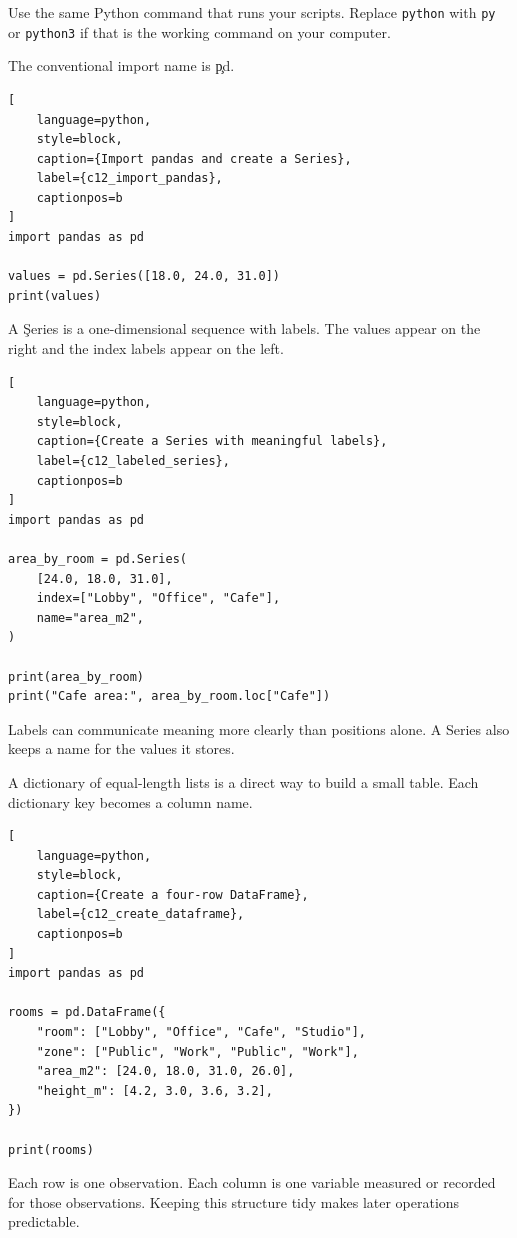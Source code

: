 Use the same Python command that runs your scripts. Replace \texttt{python}
with \texttt{py} or \texttt{python3} if that is the working command on your
computer.

The conventional import name is \c{pd}.

\begin{lstlisting}[
    language=python,
    style=block,
    caption={Import pandas and create a Series},
    label={c12_import_pandas},
    captionpos=b
]
import pandas as pd

values = pd.Series([18.0, 24.0, 31.0])
print(values)
\end{lstlisting}


A \c{Series} is a one-dimensional sequence with labels. The values appear on
the right and the index labels appear on the left.

\begin{lstlisting}[
    language=python,
    style=block,
    caption={Create a Series with meaningful labels},
    label={c12_labeled_series},
    captionpos=b
]
import pandas as pd

area_by_room = pd.Series(
    [24.0, 18.0, 31.0],
    index=["Lobby", "Office", "Cafe"],
    name="area_m2",
)

print(area_by_room)
print("Cafe area:", area_by_room.loc["Cafe"])
\end{lstlisting}

Labels can communicate meaning more clearly than positions alone. A Series
also keeps a name for the values it stores.


A dictionary of equal-length lists is a direct way to build a small table.
Each dictionary key becomes a column name.

\begin{lstlisting}[
    language=python,
    style=block,
    caption={Create a four-row DataFrame},
    label={c12_create_dataframe},
    captionpos=b
]
import pandas as pd

rooms = pd.DataFrame({
    "room": ["Lobby", "Office", "Cafe", "Studio"],
    "zone": ["Public", "Work", "Public", "Work"],
    "area_m2": [24.0, 18.0, 31.0, 26.0],
    "height_m": [4.2, 3.0, 3.6, 3.2],
})

print(rooms)
\end{lstlisting}

Each row is one observation. Each column is one variable measured or recorded
for those observations. Keeping this structure tidy makes later operations
predictable.

